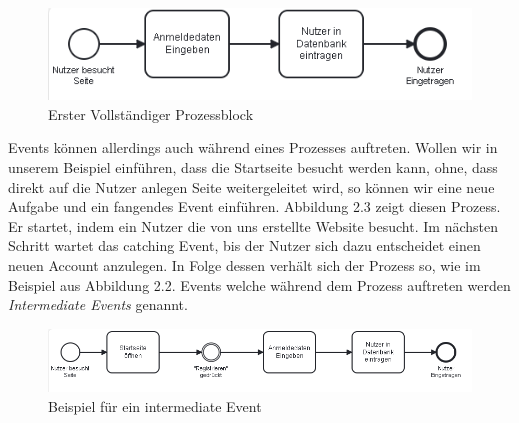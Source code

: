\begin{figure}
\centering
\includegraphics[scale=1.0]{Figures/Beispiel2}
\decoRule
\caption[Prozess Block]{Erster Vollständiger Prozessblock}
\label{fig:Task}
\end{figure}Events können allerdings auch während eines Prozesses auftreten. Wollen wir in unserem Beispiel einführen, dass die Startseite besucht werden kann, ohne, dass direkt auf die Nutzer anlegen Seite weitergeleitet wird, so können wir eine neue Aufgabe und ein fangendes Event einführen. Abbildung 2.3 zeigt diesen Prozess. Er startet, indem ein Nutzer die von uns erstellte Website besucht. Im nächsten Schritt wartet das catching Event, bis der Nutzer sich dazu entscheidet einen neuen Account anzulegen. In Folge dessen verhält sich der Prozess so, wie im Beispiel aus Abbildung 2.2. Events welche während dem Prozess auftreten werden \textit{Intermediate Events} genannt.
\begin{figure}
\centering
\includegraphics[scale=0.6]{Figures/Beispiel3}
\decoRule
\caption[Intermediate Events]{Beispiel für ein intermediate Event}
\label{fig:Task}
\end{figure}
